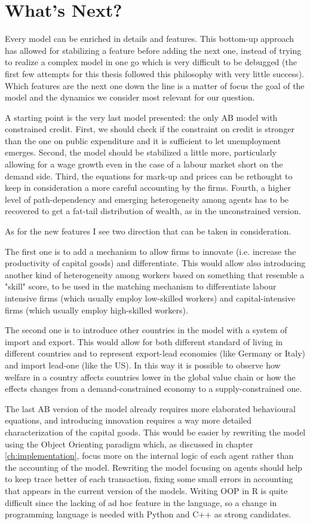 \chapter{What's Next?}
Every model can be enriched in details and features. This bottom-up approach has allowed for stabilizing a feature before adding the next one, instead of trying to realize a complex model in one go which is very difficult to be debugged (the first few attempts for this thesis followed this philosophy with very little success).
Which features are the next one down the line is a matter of focus the goal of the model and the dynamics we consider most relevant for our question.

A starting point is the very last model presented: the only AB model with constrained credit.
First, we should check if the constraint on credit is stronger than the one on public expenditure and it is sufficient to let unemployment emerges.
Second, the model should be stabilized a little more, particularly allowing for a wage growth even in the case of a labour market short on the demand side.
Third, the equations for mark-up and prices can be rethought to keep in consideration a more careful accounting by the firms.
Fourth, a higher level of path-dependency and emerging heterogeneity among agents has to be recovered to get a fat-tail distribution of wealth, as in the unconstrained version.

As for the new features I see two direction that can be taken in consideration.

The first one is to add a mechanism to allow firms to innovate (i.e. increase the productivity of capital goods) and differentiate.
This would allow also introducing another kind of heterogeneity among workers based on something that resemble a "skill" score, to be used in the matching mechanism to differentiate labour intensive firms (which usually employ low-skilled workers) and capital-intensive firms (which usually employ high-skilled workers).

The second one is to introduce other countries in the model with a system of import and export.
This would allow for both different standard of living in different countries and to represent export-lead economies (like Germany or Italy) and import lead-one (like the US).
In this way it is possible to observe how welfare in a country affects countries lower in the global value chain or how the effects changes from a demand-constrained economy to a supply-constrained one.

The last AB version of the model already requires more elaborated behavioural equations, and introducing innovation requires a way more detailed characterization of the capital goods.
This would be easier by rewriting the model using the Object Orienting paradigm which, as discussed in chapter \ref{ch:implementation}, focus more on the internal logic of each agent rather than the accounting of the model.
Rewriting the model focusing on agents should help to keep trace better of each transaction, fixing some small errors in accounting that appears in the current version of the models.
Writing OOP in R is quite difficult since the lacking of ad hoc feature in the language, so a change in programming language is needed with Python and C++ as strong candidates.

